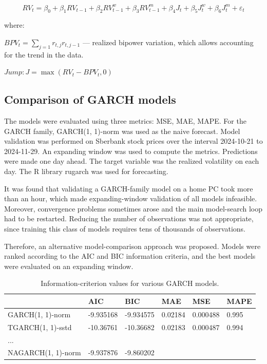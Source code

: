 \documentclass[]{article}
\begin{document}
$$RV_t = \beta_0 + \beta_1 RV_{t-1} + \beta_2 RV_{t-1}^w + \beta_3 RV_{t-1}^m + \beta_{4}J_t + \beta_5 J_t^w + \beta_6 J_t^m + \varepsilon_{t}$$

where:

$BPV_t = \sum_{j=1}r_{t, j}r_{t, j-1}$ --- realized bipower variation, which allows accounting for the trend in the data.

$Jump: J = \max(RV_t - BPV_t, 0)$


\subsection{Comparison of GARCH models}


The models were evaluated using three metrics: MSE, MAE, MAPE. For the GARCH family, GARCH(1, 1)-norm was used as the naive forecast. Model validation was performed on Sberbank stock prices over the interval 2024-10-21 to 2024-11-29. An expanding window was used to compute the metrics. Predictions were made one day ahead. The target variable was the realized volatility on each day.
The R library rugarch was used for forecasting.

It was found that validating a GARCH-family model on a home PC took more than an hour, which made expanding-window validation of all models infeasible. Moreover, convergence problems sometimes arose and the main model-search loop had to be restarted. Reducing the number of observations was not appropriate, since training this class of models requires tens of thousands of observations.

Therefore, an alternative model-comparison approach was proposed. Models were ranked according to the AIC and BIC information criteria, and the best models were evaluated on an expanding window.




\begin{table}[h!]
	\centering
	\caption{Information-criterion values for various GARCH models.}
	\begin{tabularx}{\textwidth}{|X|X|X|l|l|l|}
		\hline
		                    	& AIC        & BIC        & MAE          & MSE             & MAPE    \\ \hline
		GARCH(1, 1)-norm        & -9.935168  & -9.934575  & 0.02184 &  0.000488   & 0.995   \\ \hline
		TGARCH(1, 1)-sstd       & -10.36761  & -10.36682  &0.02183  &0.000487     &0.994   \\ \hline
		     ...    &  &   &&&    \\ \hline
		NAGARCH(1, 1)-norm      & -9.937876  & -9.860202  &&&    \\ \hline


	\end{tabularx}
	\label{tab:1}
\end{table}
\end{document}
